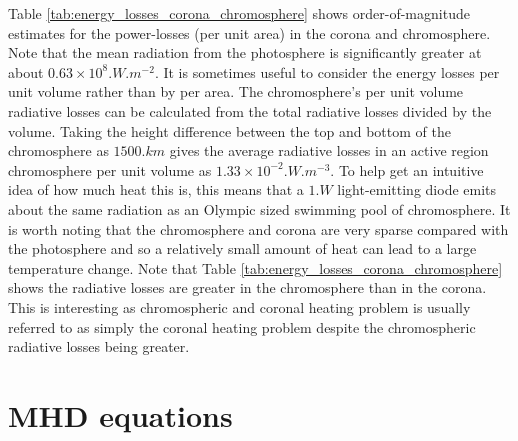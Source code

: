 Table \ref{tab:energy_losses_corona_chromosphere} shows order-of-magnitude estimates for the power-losses (per unit area) in the corona and chromosphere. Note that the mean radiation from the photosphere is significantly greater at about $0.63\times 10^8\si{.W.m^{-2}}$. It is sometimes useful to consider the energy losses per unit volume rather than by per area. The chromosphere’s per unit volume radiative losses can be calculated from the total radiative losses divided by the volume. 
Taking the height difference between the top and bottom of the chromosphere as $1500\si{.km}$ gives the average radiative losses in an active region chromosphere per unit volume as $1.33\times10^{-2}\si{.W.m^{-3}}$. To help get an intuitive idea of how much heat this is, this means that a $1\si{.W}$ light-emitting diode emits about the same radiation as an Olympic sized swimming pool of chromosphere. It is worth noting that the chromosphere and corona are very sparse compared with the photosphere and so a relatively small amount of heat can lead to a large temperature change.
Note that Table \ref{tab:energy_losses_corona_chromosphere} shows the radiative losses are greater in the chromosphere than in the corona. This is interesting as chromospheric and coronal heating problem is usually referred to as simply the coronal heating problem despite the chromospheric radiative losses being greater.

\section{MHD equations}
\label{sec:mhd equations}

